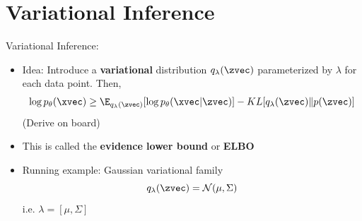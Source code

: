 
\section{Variational Inference}
\begin{frame}
  \begin{center}
   \end{center}
Variational Inference:
\begin{itemize}
\item Idea: Introduce a \textbf{variational} distribution $q_\lambda(\zvec)$
parameterized by $\lambda$ for each data point. Then,
\begin{align*}
\log p_\theta(\xvec) \ge \E_{q_\lambda(\zvec)} [\log p_\theta(\xvec|\zvec)] - KL[q_\lambda(\zvec) \Vert p(\zvec)]
\end{align*}
(Derive on board)
\item This is called the \textbf{evidence lower bound} or \textbf{ELBO}
\item Running example: Gaussian variational family 
\[ q_\lambda(\zvec) = \mathcal{N}(\mu , \Sigma)\]
i.e. $\lambda = [\mu, \Sigma]$
\end{itemize}
\end{frame}

